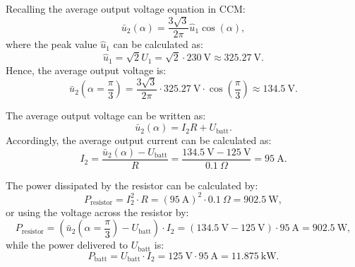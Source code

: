 
\begin{solutionblock}

\end{solutionblock}
\begin{solutionblock}
Recalling the average output voltage equation in CCM:
$$\bar{u}_\mathrm{2}(\alpha) = \frac{3\sqrt{3}}{2\pi}\hat{u}_\mathrm{1}\cos(\alpha),$$            
where the peak value $\hat{u}_\mathrm{1}$ can be calculated as:
$$ \hat{u}_\mathrm{1} = \sqrt{2}U_\mathrm{1}= \sqrt{2}\cdot\SI{230}{\volt} \approx \SI{325.27}{\volt}.$$
Hence, the average output voltage is:
$$ \bar{u}_\mathrm{2}(\alpha=\frac{\pi}{3}) = \frac{3\sqrt{3}}{2\pi}\cdot \SI{325.27}{\volt}\cdot\cos(\frac{\pi}{3}) \approx \SI{134.5}{\volt}.$$
\end{solutionblock}
\begin{solutionblock}
The average output voltage can be written as:
$$ \bar{u}_\mathrm{2}(\alpha) = I_\mathrm{2}R + U_\mathrm{batt}.$$
Accordingly, the average output current can be calculated as:
$$  I_\mathrm{2} =  \frac{\bar{u}_\mathrm{2}(\alpha) - U_\mathrm{batt}}{R}=  \frac{\SI{134.5}{\volt} - \SI{125}{\volt}}{\SI{0.1}{\Omega}} = \SI{95}{\ampere}.$$
\end{solutionblock}
\begin{solutionblock}
The power dissipated by the resistor can be calculated by:
            $$ P_\mathrm{resistor} = I^2_\mathrm{2} \cdot R = (\SI{95}{\ampere})^2 \cdot \SI{0.1}{\Omega} = \SI{902.5}{\watt},$$
            or using the voltage across the resistor by:
           $$ P_\mathrm{resistor} = (\bar{u}_\mathrm{2}(\alpha=\frac{\pi}{3}) - U_\mathrm{batt})\cdot I_\mathrm{2} = (\SI{134.5}{\volt} - \SI{125}{\volt}) \cdot \SI{95}{\ampere} = \SI{902.5}{\watt},$$
while the power delivered to $U_\mathrm{batt}$ is:
           $$ P_\mathrm{batt} =U_\mathrm{batt}\cdot I_\mathrm{2} = \SI{125}{\volt} \cdot \SI{95}{\ampere} = \SI{11.875}{\kilo\watt}.$$
\end{solutionblock}
